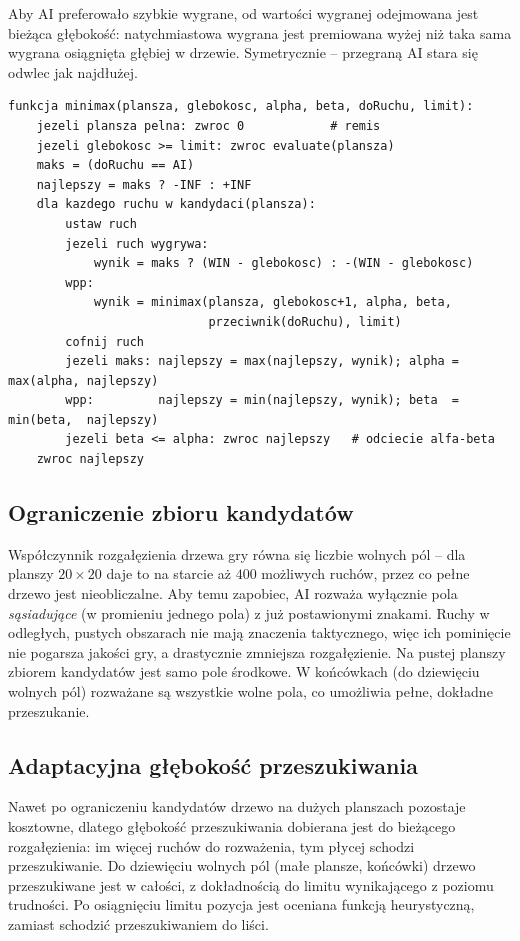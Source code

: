 Aby AI preferowało szybkie wygrane, od wartości wygranej odejmowana jest bieżąca głębokość:
natychmiastowa wygrana jest premiowana wyżej niż taka sama wygrana osiągnięta głębiej w drzewie.
Symetrycznie -- przegraną AI stara się odwlec jak najdłużej.

\begin{lstlisting}[style=pseudo, caption={Szkielet MinMaxa z odcinaniem alfa-beta (uproszczony).}, label={lst:minimax}]
funkcja minimax(plansza, glebokosc, alpha, beta, doRuchu, limit):
    jezeli plansza pelna: zwroc 0            # remis
    jezeli glebokosc >= limit: zwroc evaluate(plansza)
    maks = (doRuchu == AI)
    najlepszy = maks ? -INF : +INF
    dla kazdego ruchu w kandydaci(plansza):
        ustaw ruch
        jezeli ruch wygrywa:
            wynik = maks ? (WIN - glebokosc) : -(WIN - glebokosc)
        wpp:
            wynik = minimax(plansza, glebokosc+1, alpha, beta,
                            przeciwnik(doRuchu), limit)
        cofnij ruch
        jezeli maks: najlepszy = max(najlepszy, wynik); alpha = max(alpha, najlepszy)
        wpp:         najlepszy = min(najlepszy, wynik); beta  = min(beta,  najlepszy)
        jezeli beta <= alpha: zwroc najlepszy   # odciecie alfa-beta
    zwroc najlepszy
\end{lstlisting}

\subsection{Ograniczenie zbioru kandydatów}

Współczynnik rozgałęzienia drzewa gry równa się liczbie wolnych pól -- dla planszy $20\times20$
daje to na starcie aż $400$ możliwych ruchów, przez co pełne drzewo jest nieobliczalne. Aby temu
zapobiec, AI rozważa wyłącznie pola \emph{sąsiadujące} (w promieniu jednego pola) z już
postawionymi znakami. Ruchy w odległych, pustych obszarach nie mają znaczenia taktycznego, więc
ich pominięcie nie pogarsza jakości gry, a drastycznie zmniejsza rozgałęzienie. Na pustej planszy
zbiorem kandydatów jest samo pole środkowe. W końcówkach (do dziewięciu wolnych pól) rozważane są
wszystkie wolne pola, co umożliwia pełne, dokładne przeszukanie.

\subsection{Adaptacyjna głębokość przeszukiwania}

Nawet po ograniczeniu kandydatów drzewo na dużych planszach pozostaje kosztowne, dlatego głębokość
przeszukiwania dobierana jest do bieżącego rozgałęzienia: im więcej ruchów do rozważenia, tym płycej
schodzi przeszukiwanie. Do dziewięciu wolnych pól (małe plansze, końcówki) drzewo przeszukiwane jest
w całości, z dokładnością do limitu wynikającego z poziomu trudności. Po osiągnięciu limitu pozycja
jest oceniana funkcją heurystyczną, zamiast schodzić przeszukiwaniem do liści.

